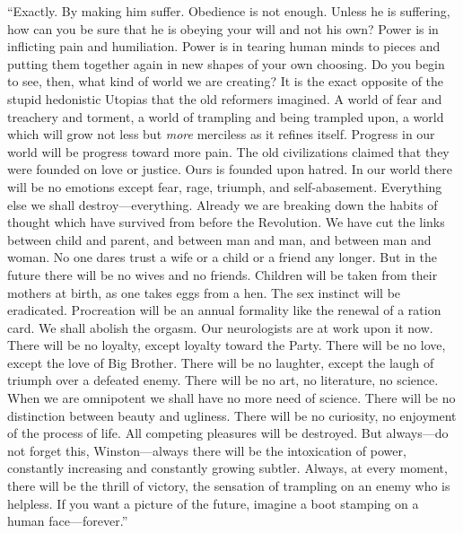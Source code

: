\begin{paracol}{2}
``Exactly. By making him suffer. Obedience is not enough. Unless he is
suffering, how can you be sure that he is obeying your will and not his
own? Power is in inflicting pain and humiliation. Power is in tearing
human minds to pieces and putting them together again in new shapes of
your own choosing. Do you begin to see, then, what kind of world we are
creating? It is the exact opposite of the stupid hedonistic Utopias that
the old reformers imagined. A world of fear and treachery and torment, a
world of trampling and being trampled upon, a world which will grow not
less but \emph{more} merciless as it refines itself. Progress in our
world will be progress toward more pain. The old civilizations claimed
that they were founded on love or justice. Ours is founded upon hatred.
In our world there will be no emotions except fear, rage, triumph, and
self-abasement. Everything else we shall destroy---everything. Already
we are breaking down the habits of thought which have survived from
before the Revolution. We have cut the links between child and parent,
and between man and man, and between man and woman. No one dares trust a
wife or a child or a friend any longer. But in the future there will be
no wives and no friends. Children will be taken from their mothers at
birth, as one takes eggs from a hen. The sex instinct will be
eradicated. Procreation will be an annual formality like the renewal of
a ration card. We shall abolish the orgasm. Our neurologists are at work
upon it now. There will be no loyalty, except loyalty toward the Party.
There will be no love, except the love of Big Brother. There will be no
laughter, except the laugh of triumph over a defeated enemy. There will
be no art, no literature, no science. When we are omnipotent we shall
have no more need of science. There will be no distinction between
beauty and ugliness. There will be no curiosity, no enjoyment of the
process of life. All competing pleasures will be destroyed. But
always---do not forget this, Winston---always there will be the
intoxication of power, constantly increasing and constantly growing
subtler. Always, at every moment, there will be the thrill of victory,
the sensation of trampling on an enemy who is helpless. If you want a
picture of the future, imagine a boot stamping on a human
face---forever.''

\switchcolumn


\end{paracol}
